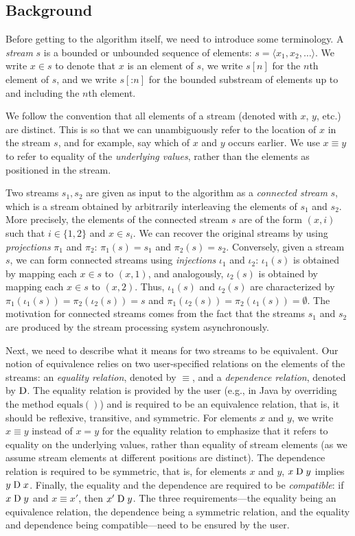 \subsection{Background}

Before getting to the algorithm itself, we need to introduce some terminology.
A \emph{stream} $s$ is a bounded or unbounded sequence of elements: $s = \langle
x_1, x_2, \ldots \rangle$.
We write $x \in s$ to denote that $x$ is an element
of $s$, we write $s[n]$ for the $n$th element of $s$, and we write
$s[\mathbin{:} n]$ for the bounded substream of elements up to and including the $n$th
element.

We follow the convention that all elements of a stream (denoted with $x$, $y$, etc.) are distinct. This is so that we can unambiguously refer to the location of $x$ in the stream $s$, and for example, say which of $x$ and $y$ occurs earlier. We use $x \equiv y$ to refer to equality of the \emph{underlying values}, rather than the elements as positioned in the stream.

Two streams $s_1, s_2$ are given as input to the algorithm as
a \emph{connected stream} $s$, which
is a stream obtained by arbitrarily interleaving the elements of $s_1$ and $s_2$.
More
precisely, the elements of the connected stream $s$ are of the form $(x, i)$
such that $i\in\{1, 2\}$ and $x \in s_i$. We can recover the original streams
by using \emph{projections} $\pi_1$ and $\pi_2$: $\pi_1(s)=s_1$ and
$\pi_2(s)=s_2$. Conversely, given a stream $s$, we can form
connected streams using \emph{injections} $\iota_1$ and $\iota_2$: $\iota_1(s)$ is obtained by mapping each $x\in s$ to $(x,1)$, and analogously, $\iota_2(s)$ is obtained by mapping each $x\in s$ to $(x,2)$. Thus, $\iota_1(s)$ and
$\iota_2(s)$ are characterized by
$\pi_1(\iota_1(s))=\pi_2(\iota_2(s))=s$ and
$\pi_1(\iota_2(s))=\pi_2(\iota_1(s))=\emptyset$.
The motivation for connected streams comes from the fact that the streams $s_1$
and $s_2$ are produced by the stream processing system asynchronously.

Next, we need to describe what it means for two streams to be
equivalent.  Our notion of equivalence relies on two user-specified
relations on the elements of the streams: an \emph{equality relation},
denoted by $\equiv$, and a \emph{dependence relation}, denoted by
$\mathrel{\mathrm{D}}$. The equality relation is provided by the
user (e.g., in Java by overriding the method $\mathrm{equals()}$) and is required to be an equivalence
relation, that is, it should be reflexive, transitive, and
symmetric. For elements $x$ and $y$, we write $x \equiv y$ instead of
$x = y$ for the equality relation to emphasize that it refers to equality on the underlying values, rather than equality of stream elements (as we assume stream elements at different positions are distinct).
The dependence relation is required to be symmetric, that is, for elements
$x$ and $y$, $x \mathrel{\mathrm{D}} y$ implies $y \mathrel{\mathrm{D}} x$. Finally, the equality and
the dependence are required to be \emph{compatible}: if $x \mathrel{\mathrm{D}} y$ and
$x \equiv x'$, then $x' \mathrel{\mathrm{D}} y$. The three requirements---the equality
being an equivalence relation, the dependence being a symmetric relation,
and the equality and dependence being compatible---need to be ensured
by the user.

